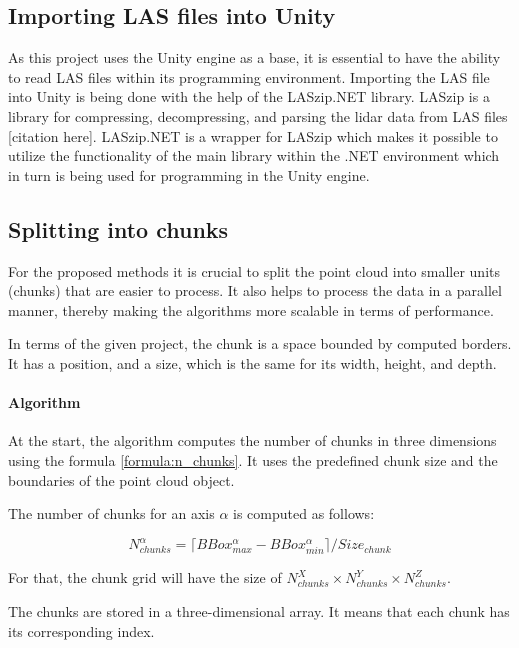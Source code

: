 \subsection{Importing LAS files into Unity}
\label{subsec:importing_las_unity}

As this project uses the Unity engine as a base, it is essential to have the ability to read LAS files within its programming environment. Importing the LAS file into Unity is being done with the help of the LASzip.NET library.
LASzip is a library for compressing, decompressing, and parsing the lidar data from LAS files [citation here]. LASzip.NET is a wrapper for LASzip which makes it possible to utilize the functionality of the main library within the .NET environment which in turn is being used for programming in the Unity engine.

\subsection{Splitting into chunks}
\label{subsec:splitting_into_chunks}

For the proposed methods it is crucial to split the point cloud into smaller units (chunks) that are easier to process. It also helps to process the data in a parallel manner, thereby making the algorithms more scalable in terms of performance.

In terms of the given project, the chunk is a space bounded by computed borders. It has a position, and a size, which is the same for its width, height, and depth. 

\paragraph{Algorithm}
At the start, the algorithm computes the number of chunks in three dimensions using the formula \ref{formula:n_chunks}. It uses the predefined chunk size and the boundaries of the point cloud object.

The number of chunks for an axis $\alpha$ is computed as follows:

\begin{equation}
\label{formula:n_chunks}
N_{chunks}^\alpha = \lceil BBox_{max}^\alpha - BBox_{min}^\alpha \rceil / Size_{chunk}
\end{equation}

For that, the chunk grid will have the size of $N_{chunks}^X \times N_{chunks}^Y \times N_{chunks}^Z$.

The chunks are stored in a three-dimensional array. It means that each chunk has its corresponding index.

